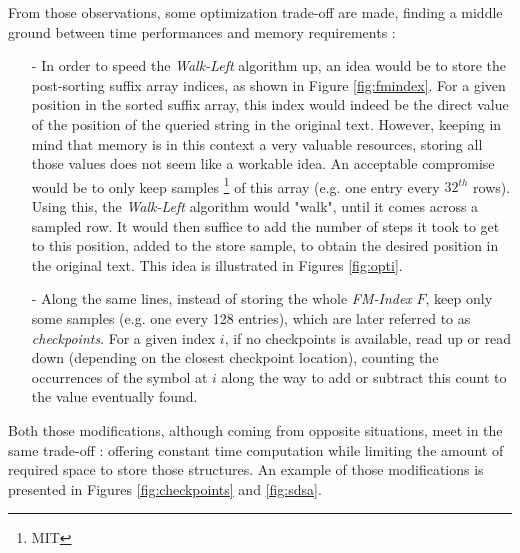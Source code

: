 From those observations, some optimization trade-off are made,  finding a middle ground between time performances and memory requirements :
	\begin{itemize}
		\item [-] In order to speed the \textsl{Walk-Left} algorithm up, an idea would be to store the post-sorting suffix array indices, as shown in Figure \ref{fig:fmindex}. For a given position in the sorted suffix array, this index would indeed be the direct value of the position of the queried string in the original text. However, keeping in mind that memory is in this context a very valuable resources, storing all those values does not seem like a workable idea. An acceptable compromise would be to only keep samples \footnote{MIT} of this array (e.g. one entry every $32^{th}$ rows). Using this, the \textsl{Walk-Left} algorithm would "walk", until it comes across a sampled row. It would then suffice to add the number of steps it took to get to this position, added to the store sample, to obtain the desired position in the original text. This idea is illustrated in Figures \ref{fig:opti}.

		\item [-] Along the same lines, instead of storing the whole \textsl{FM-Index} $F$, keep only some samples (e.g. one every 128 entries), which are later referred to as \textit{checkpoints}. For a given index $i$, if no checkpoints is available, read up or read down (depending on the closest checkpoint location), counting the occurrences of the symbol at $i$ along the way to add or subtract this count to the value eventually found.
				\end{itemize}
	
Both those modifications, although coming from opposite situations, meet in the same trade-off : offering constant time computation while limiting the amount of required space to store those structures. An example of those modifications is presented in Figures \ref{fig:checkpoints} and \ref{fig:sdsa}.


